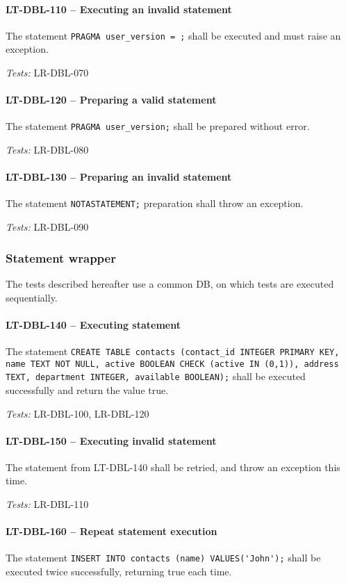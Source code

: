 \paragraph{LT-DBL-110 -- Executing an invalid statement}
The statement \lstinline{PRAGMA user_version = ;} shall be executed and must
raise an exception.

\textit{Tests: } LR-DBL-070

\paragraph{LT-DBL-120 -- Preparing a valid statement}
The statement \lstinline{PRAGMA user_version;} shall be prepared
without error.

\textit{Tests: } LR-DBL-080

\paragraph{LT-DBL-130 -- Preparing an invalid statement}
The statement \lstinline{NOTASTATEMENT;} preparation shall
throw an exception.

\textit{Tests: } LR-DBL-090

\subsubsection{Statement wrapper}
The tests described hereafter use a common DB, on which tests are
executed sequentially.

\paragraph{LT-DBL-140 -- Executing statement}
The statement
\lstinline{CREATE TABLE contacts (contact_id INTEGER PRIMARY KEY, name TEXT NOT NULL, active BOOLEAN CHECK (active IN (0,1)), address TEXT, department INTEGER, available BOOLEAN);}
shall be executed successfully and return the value true.

\textit{Tests: } LR-DBL-100, LR-DBL-120

\paragraph{LT-DBL-150 -- Executing invalid statement}
The statement from LT-DBL-140 shall be retried, and throw an exception
this time.

\textit{Tests: } LR-DBL-110

\paragraph{LT-DBL-160 -- Repeat statement execution}
The statement \lstinline{INSERT INTO contacts (name) VALUES('John');}
shall be executed twice successfully, returning true each time.

